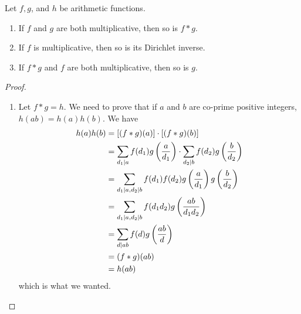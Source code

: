 	\begin{theorem}  \label{thm:mft}
		Let $f,g$, and $h$ be arithmetic functions.
			\begin{enumerate}
				\item If $f$ and $g$ are both multiplicative, then so is $f\ast g$.
				\item If $f$ is multiplicative, then so is its Dirichlet inverse.
				\item If $f\ast g$ and $f$ are both multiplicative, then so is $g$.
			\end{enumerate}
	\end{theorem}

	\begin{proof}
		$ $
		\begin{enumerate}
			\item Let $f\ast g=h$. We need to prove that if $a$ and $b$ are co-prime positive integers, $h(ab)=h(a)h(b)$. We have
				\begin{align*}
					h(a)h(b)
						& = \left[(f\ast g)(a)\right]\cdot \left[(f\ast g)(b)\right]\\
						& = \sum\limits_{d_1\mid a}f(d_1)g\left(\frac{a}{d_1}\right)\cdot \sum\limits_{d_2\mid b}f(d_2)g\left(\frac{b}{d_2}\right)\\
						& = \sum\limits_{d_1\mid a, d_2\mid b}f(d_1)f(d_2)g\left(\frac{a}{d_1}\right)g\left(\frac{b}{d_2}\right)\\
						& = \sum\limits_{d_1\mid a, d_2\mid b}f(d_1d_2)g\left(\frac{ab}{d_1d_2}\right)\\
						& = \sum\limits_{d\mid ab}f(d)g\left(\frac{ab}{d}\right)\\
						& = (f\ast g)(ab)\\
						& =h(ab)
				\end{align*}
			which is what we wanted.


\end{enumerate}
\end{proof}
